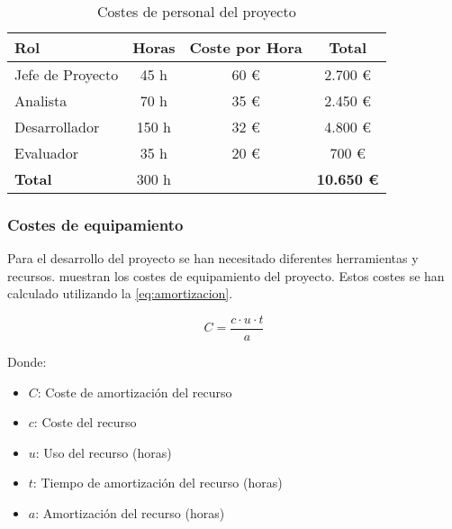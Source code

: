 \begin{table}[htbp]
    \centering
    \caption{Costes de personal del proyecto}
    \label{tab:costes_personal}
    \begin{tabular}{@{}lccc@{}}
    \toprule
    \textbf{Rol}     & \textbf{Horas} & \textbf{Coste por Hora} & \textbf{Total}   \\ \midrule
    Jefe de Proyecto & 45 h            & 60 \euro                 & 2.700 \euro       \\
    Analista         & 70 h            & 35 \euro                 & 2.450 \euro       \\
    Desarrollador    & 150 h           & 32 \euro                 & 4.800 \euro       \\
    Evaluador        & 35 h            & 20 \euro                 & 700 \euro         \\ \midrule
    \textbf{Total}   & 300 h           &                         & \textbf{10.650 \euro} \\ \bottomrule
    \end{tabular}
\end{table}

\subsubsection{Costes de equipamiento}
Para el desarrollo del proyecto se han necesitado diferentes herramientas y recursos.  muestran los costes de equipamiento del proyecto. Estos costes se han calculado utilizando la \eqref{eq:amortizacion}. 

\begin{equation}
    C = \frac{c \cdot u \cdot t}{a}
    \label{eq:amortizacion}
\end{equation}


Donde:
\begin{itemize}
    \item $C$: Coste de amortización del recurso
    \item $c$: Coste del recurso
    \item $u$: Uso del recurso (horas)
    \item $t$: Tiempo de amortización del recurso (horas)
    \item $a$: Amortización del recurso (horas)
\end{itemize}

